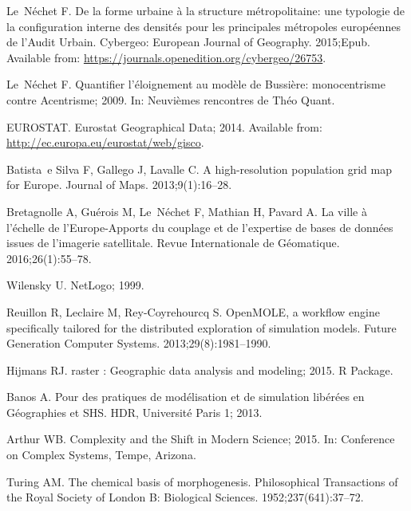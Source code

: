 \documentclass[10pt,letterpaper]{article}
\begin{document}
\begin{thebibliography}{10}
Le~N{\'e}chet F.
\newblock De la forme urbaine {\`a} la structure m{\'e}tropolitaine: une
  typologie de la configuration interne des densit{\'e}s pour les principales
  m{\'e}tropoles europ{\'e}ennes de l'Audit Urbain.
\newblock Cybergeo: European Journal of Geography. 2015;Epub.
\newblock Available from:
  \url{https://journals.openedition.org/cybergeo/26753}.

Le~N{\'e}chet F. Quantifier l'{\'e}loignement au mod{\`e}le de Bussi{\`e}re:
  monocentrisme contre Acentrisme; 2009.
\newblock In: Neuvi{\`e}mes rencontres de Th{\'e}o Quant.

EUROSTAT. Eurostat Geographical Data; 2014.
\newblock Available from: \url{http://ec.europa.eu/eurostat/web/gisco}.

Batista~e Silva F, Gallego J, Lavalle C.
\newblock A high-resolution population grid map for Europe.
\newblock Journal of Maps. 2013;9(1):16--28.

Bretagnolle A, Gu{\'e}rois M, Le~N{\'e}chet F, Mathian H, Pavard A.
\newblock La ville {\`a} l'{\'e}chelle de l'Europe-Apports du couplage et de
  l'expertise de bases de donn{\'e}es issues de l'imagerie satellitale.
\newblock Revue Internationale de G{\'e}omatique. 2016;26(1):55--78.

Wilensky U. NetLogo; 1999.

Reuillon R, Leclaire M, Rey-Coyrehourcq S.
\newblock OpenMOLE, a workflow engine specifically tailored for the distributed
  exploration of simulation models.
\newblock Future Generation Computer Systems. 2013;29(8):1981--1990.

Hijmans RJ. raster : Geographic data analysis and modeling; 2015.
\newblock R Package.

Banos A.
\newblock Pour des pratiques de mod{\'e}lisation et de simulation
  lib{\'e}r{\'e}es en G{\'e}ographies et SHS.
\newblock HDR, Universit{\'e} Paris 1; 2013.

Arthur WB. Complexity and the Shift in Modern Science; 2015.
\newblock In: Conference on Complex Systems, Tempe, Arizona.

Turing AM.
\newblock The chemical basis of morphogenesis.
\newblock Philosophical Transactions of the Royal Society of London B:
  Biological Sciences. 1952;237(641):37--72.


\end{thebibliography}
\end{document}
